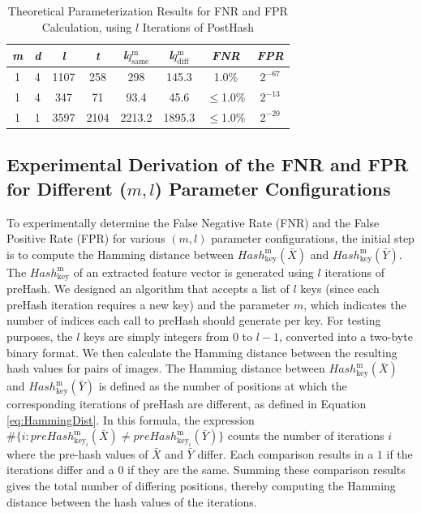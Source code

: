 \begin{table}[htbp] 
    \centering
    \begin{tabular}{|c|c|c|c|c|c|c|c|}
        \hline
        \textit{m} & \textit{d} & \textit{l} & \textit{t} & \textit{l}\(q_{\text{same}}^\text{m}\) & \textit{l}\(q_{\text{diff}}^\text{m}\) & \textit{FNR} & \textit{FPR} \\
        \hline
        1 & 4 & 1107 & 258 & 298 & 145.3 & 1.0\% & \(2^{-67}\) \\
        1 & 4 & 347 & 71 & 93.4 & 45.6 & \(\leq\)1.0\% & \(2^{-13}\)\\
        1 & 1 & 3597 & 2104 & 2213.2 & 1895.3 & \(\leq\)1.0\% & \(2^{-20}\)\\
        \hline
    \end{tabular}
    \caption{Theoretical Parameterization Results for FNR and FPR Calculation, using $l$ Iterations of PostHash}
    \label{tab:theoretical_parameterization_PostHash}
\end{table}


\newpage
\subsection{Experimental Derivation of the FNR and FPR for Different (\(m, l\)) Parameter Configurations}

To experimentally determine the False Negative Rate (FNR) and the False Positive Rate (FPR) for various \((m, l)\) parameter configurations, the initial step is to compute the Hamming distance between \( Hash_{\text{key}}^\text{m}(\bar{X}) \) and \( Hash_{\text{key}}^\text{m}(\bar{Y}) \). The \( Hash_{\text{key}}^\text{m} \) of an extracted feature vector is generated using \( l \) iterations of preHash. We designed an algorithm that accepts a list of \( l \) keys (since each preHash iteration requires a new key) and the parameter \( m \), which indicates the number of indices each call to preHash should generate per key. For testing purposes, the \( l \) keys are simply integers from 0 to \( l-1 \), converted into a two-byte binary format. We then calculate the Hamming distance between the resulting hash values for pairs of images. The Hamming distance between \( Hash_{\text{key}}^\text{m}(\bar{X}) \) and \( Hash_{\text{key}}^\text{m}(\bar{Y}) \) is defined as the number of positions at which the corresponding iterations of preHash are different, as defined in Equation \ref{eq:HammingDist}. In this formula, the expression \( \# \{ i : preHash_{\text{key}_i}^\text{m}(\bar{X}) \neq preHash_{\text{key}_i}^\text{m}(\bar{Y}) \} \) counts the number of iterations \( i \) where the pre-hash values of \( \bar{X} \) and \( \bar{Y} \) differ. Each comparison results in a \(1\) if the iterations differ and a \(0\) if they are the same. Summing these comparison results gives the total number of differing positions, thereby computing the Hamming distance between the hash values of the iterations.


